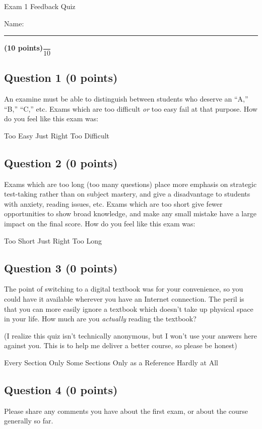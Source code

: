 \documentclass[12pt, letterpaper]{memoir}
\begin{document}
\begin{center}
	{\large	Exam 1 Feedback Quiz}
\end{center}
{\large Name: \rule[-1mm]{4in}{.1pt} {\bfseries (10 points)}\hspace{4em}$\dfrac{~}{10}$}
\subsection*{Question 1 (0 points)}
An examine must be able to distinguish between students who deserve an ``A,'' ``B,'' ``C,'' etc. Exams which are too difficult \emph{or} too easy fail at that purpose. How do you feel like this exam was:

{\large Too Easy} \hspace{2em} {\large Just Right} \hspace{2em} {\large Too Difficult}

\vspace{2em}
\subsection*{Question 2 (0 points)}
Exams which are too long (too many questions) place more emphasis on strategic test-taking rather than on subject mastery, and give a disadvantage to students with anxiety, reading issues, etc. Exams which are too short give fewer opportunities to show broad knowledge, and make any small mistake have a large impact on the final score.  How do you feel like this exam was:

{\large Too Short} \hspace{2em} {\large Just Right} \hspace{2em} {\large Too Long}

\vspace{2em}
\subsection*{Question 3 (0 points)}
The point of switching to a digital textbook was for your convenience, so you could have it available wherever you have an Internet connection. The peril is that you can more easily ignore a textbook which doesn't take up physical space in your life. How much are you \emph{actually} reading the textbook?

\noindent(I realize this quiz isn't technically anonymous, but I won't use your answers here against you. This is to help me deliver a better course, so please be honest)

{\large Every Section} \hspace{2em} {\large Only Some Sections} \hspace{2em} {\large Only as a Reference} \hspace{2em} {\large Hardly at All}

\vspace{2em}
\subsection*{Question 4 (0 points)}
Please share any comments you have about the first exam, or about the course generally so far.
\end{document}
